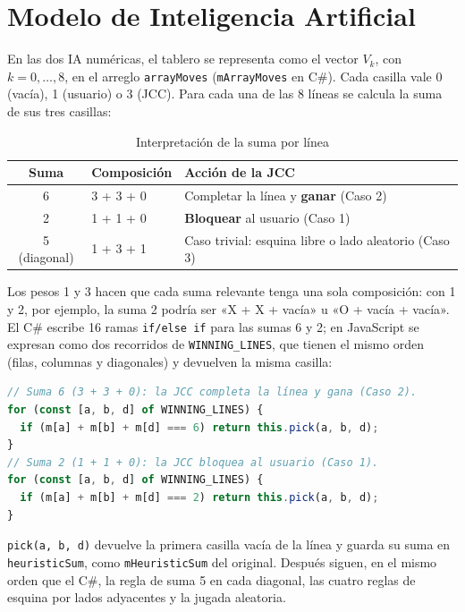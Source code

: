 \documentclass[12pt,a4paper]{article}
\begin{document}
\section{Modelo de Inteligencia Artificial}
En las dos IA numéricas, el tablero se representa como el vector $V_k$, con
$k = 0,\dots,8$, en el arreglo \texttt{arrayMoves} (\texttt{mArrayMoves} en C\#).
Cada casilla vale 0 (vacía), 1 (usuario) o 3 (JCC). Para cada una de las 8 líneas
se calcula la suma de sus tres casillas:

\begin{table}[H]
\centering
\caption{Interpretación de la suma por línea}
\begin{tabular}{cll}
\toprule
\textbf{Suma} & \textbf{Composición} & \textbf{Acción de la JCC}\\
\midrule
6 & 3 + 3 + 0 & Completar la línea y \textbf{ganar} (Caso 2)\\
2 & 1 + 1 + 0 & \textbf{Bloquear} al usuario (Caso 1)\\
5 (diagonal) & 1 + 3 + 1 & Caso trivial: esquina libre o lado aleatorio (Caso 3)\\
\bottomrule
\end{tabular}
\end{table}

Los pesos 1 y 3 hacen que cada suma relevante tenga una sola composición: con
1 y 2, por ejemplo, la suma 2 podría ser «X + X + vacía» u «O + vacía + vacía».
El C\# escribe 16 ramas \texttt{if/else if} para las sumas 6 y 2; en JavaScript
se expresan como dos recorridos de \texttt{WINNING\_LINES}, que tienen el mismo
orden (filas, columnas y diagonales) y devuelven la misma casilla:

\begin{lstlisting}[language=JavaScript]
// Suma 6 (3 + 3 + 0): la JCC completa la línea y gana (Caso 2).
for (const [a, b, d] of WINNING_LINES) {
  if (m[a] + m[b] + m[d] === 6) return this.pick(a, b, d);
}
// Suma 2 (1 + 1 + 0): la JCC bloquea al usuario (Caso 1).
for (const [a, b, d] of WINNING_LINES) {
  if (m[a] + m[b] + m[d] === 2) return this.pick(a, b, d);
}
\end{lstlisting}

\texttt{pick(a, b, d)} devuelve la primera casilla vacía de la línea y guarda su
suma en \texttt{heuristicSum}, como \texttt{mHeuristicSum} del original. Después
siguen, en el mismo orden que el C\#, la regla de suma 5 en cada diagonal, las
cuatro reglas de esquina por lados adyacentes y la jugada aleatoria.
\end{document}
